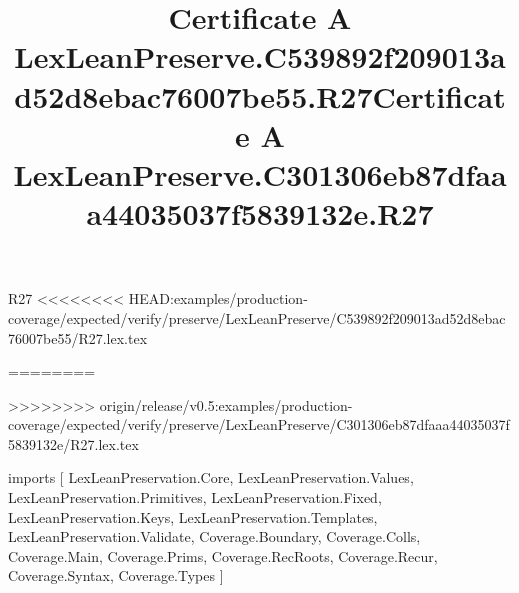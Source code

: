 \begin{lexlean}{R27}
<<<<<<<< HEAD:examples/production-coverage/expected/verify/preserve/LexLeanPreserve/C539892f209013ad52d8ebac76007be55/R27.lex.tex
\title{Certificate A LexLeanPreserve.C539892f209013ad52d8ebac76007be55.R27}
========
\title{Certificate A LexLeanPreserve.C301306eb87dfaaa44035037f5839132e.R27}
>>>>>>>> origin/release/v0.5:examples/production-coverage/expected/verify/preserve/LexLeanPreserve/C301306eb87dfaaa44035037f5839132e/R27.lex.tex
\begin{coremodule}
imports [
  LexLeanPreservation.Core,
  LexLeanPreservation.Values,
  LexLeanPreservation.Primitives,
  LexLeanPreservation.Fixed,
  LexLeanPreservation.Keys,
  LexLeanPreservation.Templates,
  LexLeanPreservation.Validate,
  Coverage.Boundary,
  Coverage.Colls,
  Coverage.Main,
  Coverage.Prims,
  Coverage.RecRoots,
  Coverage.Recur,
  Coverage.Syntax,
  Coverage.Types
]


\end{coremodule}
\end{lexlean}
